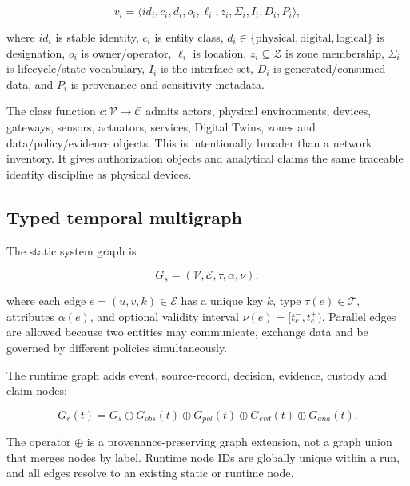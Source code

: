 ﻿\documentclass[10pt,a4paper,twocolumn]{article}
\begin{document}
\begin{equation}
v_i=\langle id_i,c_i,d_i,o_i,\ell_i,z_i,\Sigma_i,I_i,D_i,P_i\rangle,
\label{eq:entity}
\end{equation}

where \(id_i\) is stable identity, \(c_i\) is entity class, \(d_i\in\{\text{physical},\text{digital},\text{logical}\}\) is designation, \(o_i\) is owner/operator, \(\ell_i\) is location, \(z_i\subseteq\mathcal{Z}\) is zone membership, \(\Sigma_i\) is lifecycle/state vocabulary, \(I_i\) is the interface set, \(D_i\) is generated/consumed data, and \(P_i\) is provenance and sensitivity metadata.

The class function \(c:\mathcal{V}\rightarrow\mathcal{C}\) admits actors, physical environments, devices, gateways, sensors, actuators, services, Digital Twins, zones and data/policy/evidence objects. This is intentionally broader than a network inventory. It gives authorization objects and analytical claims the same traceable identity discipline as physical devices.

\subsection{Typed temporal multigraph}

The static system graph is

\begin{equation}
G_s=(\mathcal{V},\mathcal{E},\tau,\alpha,\nu),
\label{eq:graph}
\end{equation}

where each edge \(e=(u,v,k)\in\mathcal{E}\) has a unique key \(k\), type \(\tau(e)\in\mathcal{T}\), attributes \(\alpha(e)\), and optional validity interval \(\nu(e)=[t_e^-,t_e^+)\). Parallel edges are allowed because two entities may communicate, exchange data and be governed by different policies simultaneously.

The runtime graph adds event, source-record, decision, evidence, custody and claim nodes:

\begin{equation}
G_r(t)=G_s\oplus G_{obs}(t)\oplus G_{pol}(t)\oplus G_{evd}(t)\oplus G_{ana}(t).
\label{eq:runtimegraph}
\end{equation}

The operator \(\oplus\) is a provenance-preserving graph extension, not a graph union that merges nodes by label. Runtime node IDs are globally unique within a run, and all edges resolve to an existing static or runtime node.
\end{document}
